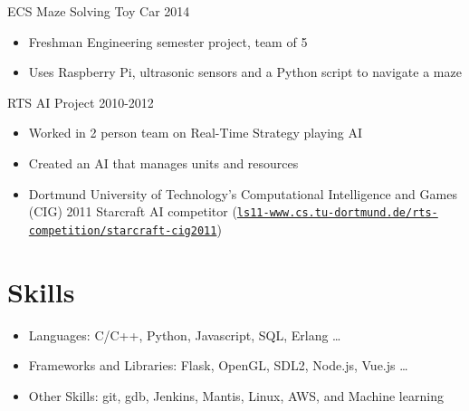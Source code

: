 \documentclass[line,margin]{res}
\begin{document}
\begin{resume}


\vspace{-8pt}
ECS Maze Solving Toy Car
\hfill 2014
	\begin{itemize} \itemsep -2pt
	\item Freshman Engineering semester project, team of 5
	\item Uses Raspberry Pi, ultrasonic sensors and a Python script to navigate a maze
	\end{itemize}

\vspace{-8pt}
RTS AI Project
\hfill 2010-2012
\begin{itemize} \itemsep -2pt
	\item Worked in 2 person team on Real-Time Strategy playing AI
	\item Created an AI that manages units and resources
	\item Dortmund University of Technology’s Computational Intelligence and Games (CIG) 2011 Starcraft AI
	competitor (\href{http://ls11-www.cs.tu-dortmund.de/rts-competition/starcraft-cig2011}{\texttt{ls11-www.cs.tu-dortmund.de/rts-competition/starcraft-cig2011}})
\end{itemize}

\vspace{-4pt}
\section{Skills}
\vspace{22pt}
	\begin{itemize} \itemsep -2pt
		\item Languages: C/C++, Python, Javascript, SQL, Erlang \ldots
		\item Frameworks and Libraries: Flask, OpenGL, SDL2, Node.js, Vue.js \ldots
		\item Other Skills: git, gdb, Jenkins, Mantis, Linux, AWS, and Machine learning
	\end{itemize}


\end{resume}
\end{document}
